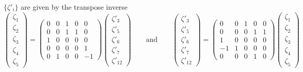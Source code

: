 \documentclass[a4paper,12pt]{article}
\begin{document}
$\{\zeta'_i\}$ are given by the transpose inverse
\[
\begin{pmatrix}
\zeta_1 \\
\zeta_2 \\
\zeta_3 \\
\zeta_4 \\
\zeta_5
\end{pmatrix}
=
\begin{pmatrix}
0 & 0 & 1 & 0 & 0 \\
0 & 0 & 1 & 1 & 0 \\
1 & 0 & 0 & 0 & 0 \\
0 & 0 & 0 & 0 & 1 \\
0 & 1 & 0 & 0 & -1
\end{pmatrix}
\begin{pmatrix}
\zeta'_3 \\
\zeta'_5 \\
\zeta'_6 \\
\zeta'_7  \\
\zeta'_{12}
\end{pmatrix}
\qquad \text{and} \qquad
\begin{pmatrix}
\zeta'_3 \\
\zeta'_5 \\
\zeta'_6 \\
\zeta'_7  \\
\zeta'_{12}
\end{pmatrix}
=
\begin{pmatrix}
0 & 0 & 1 & 0 & 0 \\
0 & 0 & 0 & 1 & 1 \\
1 & 0 & 0 & 0 & 0 \\
-1 & 1 & 0 & 0 & 0 \\
0 & 0 & 0 & 1 & 0
\end{pmatrix}
\begin{pmatrix}
\zeta_1 \\
\zeta_2 \\
\zeta_3 \\
\zeta_4 \\
\zeta_5
\end{pmatrix}
\]
\end{document}
